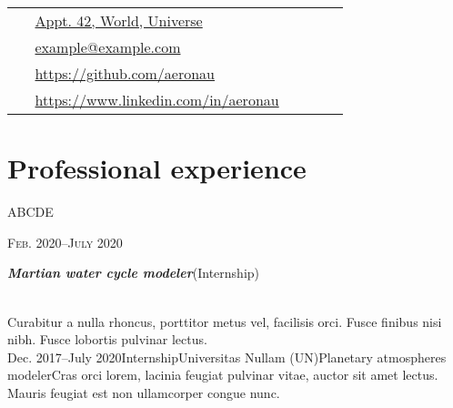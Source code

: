 \documentclass[10pt]{article} %
\newcommand{\workposition}[6]{
	\expandafter\ifstrequal\expandafter{#3}{}{}{{\raggedright #3}\hfill{\textsc{#1}}\\} %
	\expandafter\ifstrequal\expandafter{#4}{}{}{{\raggedright\large\textit{\textbf{#4}}\hfill\expandafter\ifstrequal\expandafter{#2}{}{}{{\footnotesize (#2)}}}\\[4pt]} %
	\expandafter\ifstrequal\expandafter{#5}{}{}{#5\\} %
}
\newcommand{\tableentry}[3]{
	\textsc{#1} & #2\expandafter\ifstrequal\expandafter{#3}{}{\\}{\\[3pt]} %
}
\begin{document}
\begin{paracol}{2}

 
\vspace{-0.05\textheight}
 \colorbox{shade}{
\begin{supertabular}{p{0.05\linewidth}|p{0.775\linewidth}}
\raisebox{-1pt}{\faHome}
 & \href{https://goo.gl/maps/NiMqg2mtYFxLyKfM8}{Appt. 42, World, Universe}
\\

\raisebox{0pt}{\small\faEnvelope}
 & \href{mailto:example@example.com}{example@example.com}
\\

\raisebox{-1pt}{\faGithub}
 & \href{https://github.com/aeronau}{https://github.com/aeronau}
\\

\raisebox{-1pt}{\faLinkedinSquare}
 & \href{https://www.linkedin.com/in/aeronau}{https://www.linkedin.com/in/aeronau}
\\

\end{supertabular}
}
 
\section{Professional experience}
 \workposition{Feb. 2020--July 2020}{Internship}{ABCDE}{Martian water cycle modeler}{Curabitur a nulla rhoncus, porttitor metus vel, facilisis orci. Fusce finibus nisi nibh. Fusce lobortis pulvinar lectus.}
 

 \workposition{Dec. 2017--July 2020}{Internship}{Universitas Nullam (UN)}{Planetary atmospheres modeler}{Cras orci lorem, lacinia feugiat pulvinar vitae, auctor sit amet lectus. Mauris feugiat est non ullamcorper congue nunc.}
 


\end{paracol}
\end{document}
